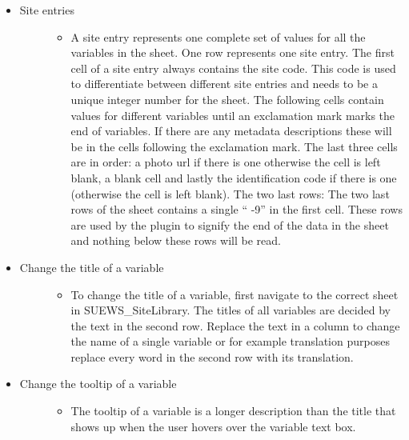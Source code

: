 \documentclass[letterpaper,10pt,english]{sphinxmanual}
\begin{document}
\begin{itemize}
\item {} \begin{description}
\item[{Site entries}] \leavevmode\begin{itemize}
\item {} 
A site entry represents one complete set of values for all the variables in the sheet. One row represents one site entry. The first cell of a site entry always contains the site code. This code is used to differentiate between different site entries and needs to be a unique integer number for the sheet. The following cells contain values for different variables until an exclamation mark marks the end of variables. If there are any metadata descriptions these will be in the cells following the exclamation mark. The last three cells are in order: a photo url if there is one otherwise the cell is left blank, a blank cell and lastly the identification code if there is one (otherwise the cell is left blank). The two last rows: The two last rows of the sheet contains a single “  -9” in the first cell. These rows are used by the plugin to signify the end of the data in the sheet and nothing below these rows will be read.

\end{itemize}

\end{description}

\item {} \begin{description}
\item[{Change the title of a variable}] \leavevmode\begin{itemize}
\item {} 
To change the title of a variable, first navigate to the correct sheet in SUEWS\_SiteLibrary. The titles of all variables are decided by the text in the second row. Replace the text in a column to change the name of a single variable or for example translation purposes replace every word in the second row with its translation.

\end{itemize}

\end{description}

\item {} \begin{description}
\item[{Change the tooltip of a variable}] \leavevmode\begin{itemize}
\item {} \begin{description}
\item[{The tooltip of a variable is a longer description than the title that shows up when the user hovers over the variable text box.}] \leavevmode
\begin{figure}[htbp]
\centering
\capstart


\end{figure}
\end{description}
\end{itemize}
\end{description}
\end{itemize}
\end{document}
